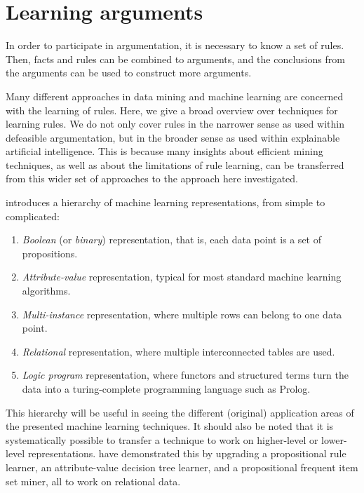 \section{Learning arguments}

In order to participate in argumentation, it is necessary to know a set of rules. Then, facts and rules can be combined to arguments, and the conclusions from the arguments can be used to construct more arguments.

Many different approaches in data mining and machine learning are concerned with the learning of rules. Here, we give a broad overview over techniques for learning rules. We do not only cover rules in the narrower sense as used within defeasible argumentation, but in the broader sense as used within explainable artificial intelligence. This is because many insights about efficient mining techniques, as well as about the limitations of rule learning, can be transferred from this wider set of approaches to the approach here investigated. 

\citet{deraedtLogicalRelationalLearning2008} introduces a hierarchy of machine learning representations, from simple to complicated:

\begin{enumerate}
\item \textit{Boolean} (or \textit{binary}) representation, that is, each data point is a set of propositions.
\item \textit{Attribute-value} representation, typical for most standard machine learning algorithms.
\item \textit{Multi-instance} representation, where multiple rows can belong to one data point.
\item \textit{Relational} representation, where multiple interconnected tables are used.
\item \textit{Logic program} representation, where functors and structured terms turn the data into a turing-complete programming language such as Prolog. 
\end{enumerate}

This hierarchy will be useful in seeing the different (original) application areas of the presented machine learning techniques. It should also be noted that it is systematically possible to transfer a technique to work on higher-level or lower-level representations. \citet[ch.~6]{deraedtLogicalRelationalLearning2008} have demonstrated this by upgrading a propositional rule learner, an attribute-value decision tree learner, and a propositional frequent item set miner, all to work on relational data.

